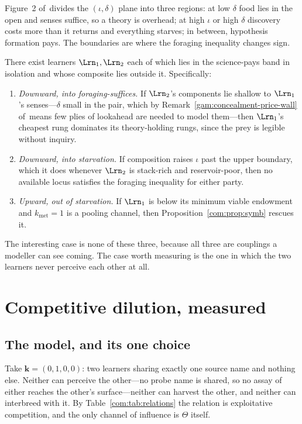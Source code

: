 Figure~2 of~\chSci divides the $(\iota,\delta)$ plane into three regions: at low $\delta$
food lies in the open and senses suffice, so a theory is overhead; at high $\iota$ or high
$\delta$ discovery costs more than it returns and everything starves; in between, hypothesis
formation pays. The boundaries are where the foraging inequality changes sign.

\begin{proposition}\label{com:prop:phase}
There exist learners $\Lrn_1, \Lrn_2$ each of which lies in the science-pays band in isolation
and whose composite lies outside it. Specifically:
\begin{enumerate}[label=(\alph*)]
\item \emph{Downward, into foraging-suffices.} If $\Lrn_2$'s components lie shallow to $\Lrn_1$'s
senses---$\delta$ small in the pair, which by Remark~\ref{gam:concealment-price-wall} of~\chGame means few plies of
lookahead are needed to model them---then $\Lrn_1$'s cheapest rung dominates its theory-holding
rungs, since the prey is legible without inquiry.
\item \emph{Downward, into starvation.} If composition raises $\iota$ past the upper boundary,
which it does whenever $\Lrn_2$ is stack-rich and reservoir-poor, then no available locus
satisfies the foraging inequality for either party.
\item \emph{Upward, out of starvation.} If $\Lrn_1$ is below its minimum viable endowment and
$k_{\mathrm{met}}=1$ is a pooling channel, then Proposition~\ref{com:prop:symb} rescues it.
\end{enumerate}
\end{proposition}

The interesting case is none of these three, because all three are couplings a modeller can see
coming. The case worth measuring is the one in which the two learners never perceive each other
at all.

\section{Competitive dilution, measured}\label{com:sec:dilution}\label{com:S10}

\subsection{The model, and its one choice}\label{com:S10.1}

Take $\mathbf{k} = (0,1,0,0)$: two learners sharing exactly one source name and nothing else.
Neither can perceive the other---no probe name is shared, so no assay of either reaches the
other's surface---neither can harvest the other, and neither can interbreed with it. By
Table~\ref{com:tab:relations} the relation is exploitative competition, and the only channel of
influence is $\Theta$ itself.

